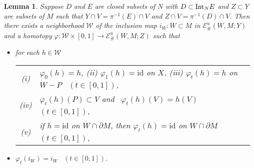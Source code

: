 \documentclass[11pt, fleqn]{amsart}
\newtheorem{lemma}{Lemma}[section]
\theoremstyle{definition}
\renewcommand{\phi}{\varphi}
\newcommand{\lra}{\longrightarrow}
\newcommand{\id}{\mathrm{id}}
\newcommand{\E}{\mathcal E}
\newcommand{\W}{\mathcal W}
\begin{document}
\begin{lemma}\label{lem_1} 
Suppose $D$ and $E$ are closed subsets of $N$ with $D \subset {\rm Int}_N E$ and 
$Z \subset Y$ are subsets of $M$ such that 
$Y \cap V = \pi^{-1}(E) \cap V$ and $Z \cap V = \pi^{-1}(D) \cap V$.  
Then there exists a neighborhood $\W$ of the inclusion map $i_W : W \subset M$ in $\E^u_\#(W, M; Y)$ and 
a homotopy $\phi : \W \times [0,1] \lra \E^u_\#(W, M; Z)$ such that 
\begin{itemize} 
\item[(1)] for each $h \in \W$ \\ 
\begin{tabular}[t]{c@{\ \,}l}
{\rm (i)} & $\phi_0(h) = h$, \hspace{3mm} 
{\rm (ii)} $\phi_1(h) = \id$ on $X$, \hspace{3mm} 
{\rm (iii)} $\phi_t(h) = h$ on $W - P$ \ $(t \in [0,1])$, \\[2mm] 
{\rm (iv)} & $\phi_t(h)(P) \subset V$ and \ $\phi_t(h)(V) = h(V)$ \ $(t \in [0,1])$, \\[2mm] 
{\rm (v)} & if $h = \id$ on $W \cap \partial M$, then $\varphi_t(h) = \id$ on $W \cap \partial M$ $(t \in [0,1])$, 
\end{tabular}
\vskip 1.5mm 
\item[(2)] $\phi_t(i_W) = i_W$ \ $(t \in [0,1])$.
\end{itemize} 
\end{lemma}
\end{document}
